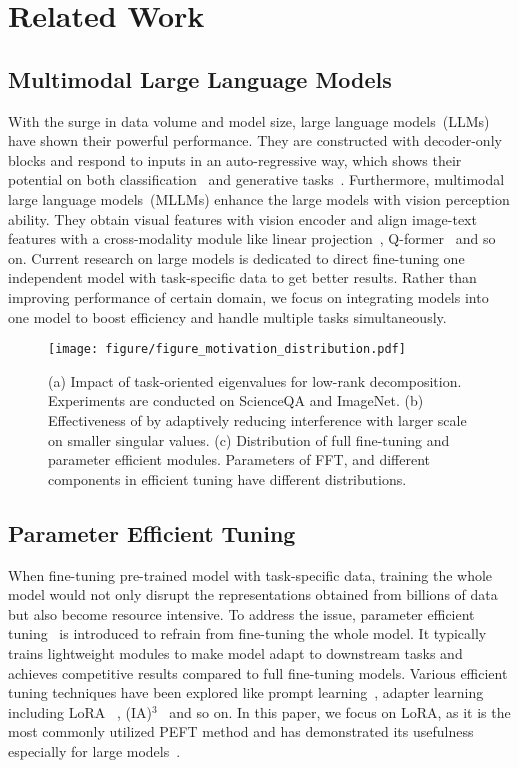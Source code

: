 \section{Related Work}
\subsection{Multimodal Large Language Models}
With the surge in data volume and model size, large language models~(LLMs)~\cite{radford2019language,touvron2023llama,alayrac2022flamingo} have shown their powerful performance. They are constructed with decoder-only blocks and respond to inputs in an auto-regressive way, which shows their potential on both classification~\cite{wang2018glue} and generative tasks~\cite{goyal2017vqa}. Furthermore, multimodal large language models~(MLLMs) enhance the large models with vision perception ability. They obtain visual features with vision encoder and align image-text features with a cross-modality module like linear projection~\cite{liu2024visual}, Q-former~\cite{li2023blip} and so on. Current research on large models is dedicated to direct fine-tuning one independent model with task-specific data to get better results. Rather than improving performance of certain domain, we focus on integrating models into one model to boost efficiency and handle multiple tasks simultaneously.

\begin{figure*}
    \centering
    \texttt{[image: figure/figure\_motivation\_distribution.pdf]}
    \vspace{-25pt}
    \caption{(a) Impact of task-oriented eigenvalues for low-rank decomposition. Experiments are conducted on ScienceQA and ImageNet. (b) Effectiveness of \modelname{} by adaptively reducing interference with larger scale on smaller singular values. (c) Distribution of full fine-tuning and parameter efficient modules. Parameters of FFT, and different components in efficient tuning have different distributions.}
    \label{fig:motivation-distribution}
    \vspace{-15pt}
\end{figure*}

\subsection{Parameter Efficient Tuning}
When fine-tuning pre-trained model with task-specific data, training the whole model would not only disrupt the representations obtained from billions of data but also become resource intensive. To address the issue, parameter efficient tuning~\cite{han2024parameter} is introduced to refrain from fine-tuning the whole model. It typically trains lightweight modules to make model adapt to downstream tasks and achieves competitive results compared to full fine-tuning models. Various efficient tuning techniques have been explored like prompt learning~\cite{jia2022visual, khattak2023maple}, adapter learning including LoRA ~\cite{hu2022lora,wu2024moslora}, (IA)$^3$~\cite{liu2022few} and so on. In this paper, we focus on LoRA, as it is the most commonly utilized PEFT method and has demonstrated its usefulness especially for large models~\cite{liu2024visual}.

